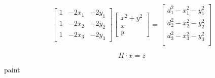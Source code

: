 \documentclass[a4paper,11pt]{scrartcl}
\begin{document}
\begin{equation}
\begin{bmatrix}
	1 & -2 x_1 & -2 y_1\\
	1 & -2 x_2 & -2 y_2\\
	1 & -2 x_3 & -2 y_3
\end{bmatrix}
\begin{bmatrix}
	x^2+y^2 \\
	x \\
	y 
\end{bmatrix}
= 
\begin{bmatrix}
	d_1^2 - x_1^2 - y_1^2 \\
	d_2^2 - x_2^2 - y_2^2 \\
	d_3^2 - x_3^2 - y_3^2 \\
\end{bmatrix}


\end{equation} 	
	  	
	  \begin{equation}
	  	H\cdot x = z 
	  \end{equation}
	  	
	  	
\newpage	  	
	  	
paint\printbibliography[heading=bibintoc, title={Bibliography}]
\end{document}
